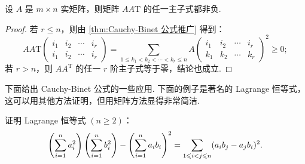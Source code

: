 \begin{corollary}{}{}
    设 $A$ 是 $m \times n$ 实矩阵，则矩阵 $AA\mathrm{T}$ 的任一主子式都非负.
\end{corollary}

\begin{proof}
    若 $r \leqslant n$，则由 \autoref{thm:Cauchy-Binet 公式推广} 得到：
    \[ AA\mathrm{T}
    \begin{pmatrix}
        i_1 & i_2 & \cdots & i_r \\
        i_1 & i_2 & \cdots & i_r
    \end{pmatrix}
    = \sum_{1 \leqslant k_1 < k_2 < \cdots < k_r \leqslant n} A
    \begin{pmatrix}
        i_1 & i_2 & \cdots & i_r \\
        k_1 & k_2 & \cdots & k_r
    \end{pmatrix}^2 \geqslant 0; \]
    若 $r > n$，则 $AA^\mathrm{T}$ 的任一 $r$ 阶主子式等于零，结论也成立.
\end{proof}

下面给出 Cauchy-Binet 公式的一些应用. 下面的例子是著名的 Lagrange 恒等式，这可以用其他方法证明，但用矩阵方法显得非常简洁.

\begin{example}{}{}
    证明 Lagrange 恒等式 $(n \geqslant 2)$：
    \[ \left( \sum_{i=1}^{n}\limits a_i^2 \right) \left( \sum_{i=1}^{n}\limits b_i^2 \right) - \left( \sum_{i=1}^{n}\limits a_i b_i \right)^2 = \sum_{1 \leqslant i < j \leqslant n} (a_i b_j - a_j b_i)^2. \]
\end{example}

